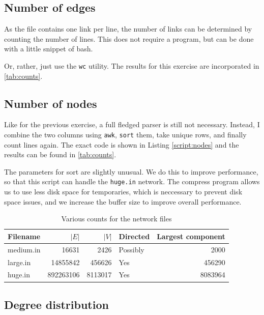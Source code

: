 \documentclass[12pt,a4paper,hidelinks]{article}
\begin{document}
\subsection{Number of edges}

As the file contains one link per line, the number of links can be determined by counting the number of lines. This does not require a program, but can be done with a little snippet of bash.



Or, rather, just use the \texttt{wc} utility. The results for this exercise are incorporated in \autoref{tab:counts}.

\subsection{Number of nodes}

Like for the previous exercise, a full fledged parser is still not necessary. Instead, I combine the two columns using \texttt{awk}, \texttt{sort} them, take unique rows, and finally count lines again. The exact code is shown in Listing \ref{script:nodes} and the results can be found in \autoref{tab:counts}.



The parameters for sort are slightly unusual. We do this to improve performance, so that this script can handle the \texttt{huge.in} network. The compress program allows us to use less disk space for temporaries, which is neccessary to prevent disk space issues, and we increase the buffer size to improve overall performance.

\begin{table}
\centering
\begin{tabular}{l | r | r | l | r}
Filename & {\centering $|E|$} & $|V|$ & Directed & Largest component\\
\hline
medium.in & 16631 & 2426 & Possibly & 2000 \\
large.in & 14855842 & 456626 & Yes & 456290 \\
huge.in & 892263106 & 8113017 & Yes & 8083964
\end{tabular}
\caption{Various counts for the network files}
\label{tab:counts}
\end{table}

\subsection{Degree distribution}
\end{document}
